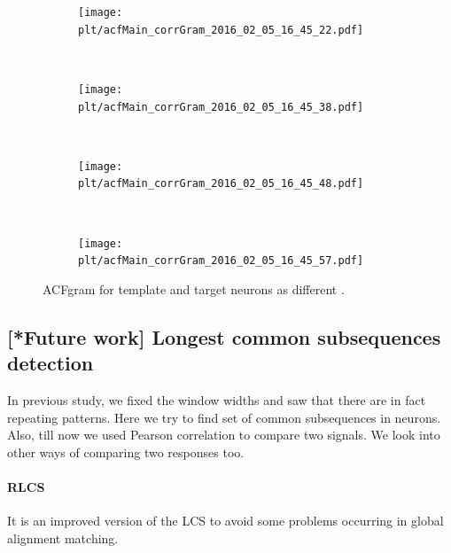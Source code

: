 \documentclass[11pt]{article}
\newcommand{\plt}{../../plots}
\begin{document}
\begin{figure}
    \centering
    \begin{subfigure}[b]{.48\textwidth}
        \centering
        \texttt{[image: \\plt/acfMain\_corrGram\_2016\_02\_05\_16\_45\_22.pdf]}
    \end{subfigure}
    ~
    \begin{subfigure}[b]{.48\textwidth}
        \centering
        \texttt{[image: \\plt/acfMain\_corrGram\_2016\_02\_05\_16\_45\_38.pdf]}
    \end{subfigure}
    \\
    \begin{subfigure}[b]{.48\textwidth}
        \centering
        \texttt{[image: \\plt/acfMain\_corrGram\_2016\_02\_05\_16\_45\_48.pdf]}
    \end{subfigure}
    ~
    \begin{subfigure}[b]{.48\textwidth}
        \centering
        \texttt{[image: \\plt/acfMain\_corrGram\_2016\_02\_05\_16\_45\_57.pdf]}
    \end{subfigure}
    \caption{ACFgram for template and target neurons as different .}
    \label{img:acfgram2}
\end{figure}

\subsection{[*Future work] Longest common subsequences detection} %
\label{sub:longest_common_subsequences}
In previous study, we fixed the window widths and saw that there are in fact repeating patterns. Here we try to find set of common subsequences in neurons. Also, till now we used Pearson correlation to compare two signals. We look into other ways of comparing two responses too.
\paragraph{RLCS} %
\label{par:rlcs}
 It is an improved version of the LCS to avoid some problems occurring in global alignment matching. 
\newpage

% 

\end{document}
